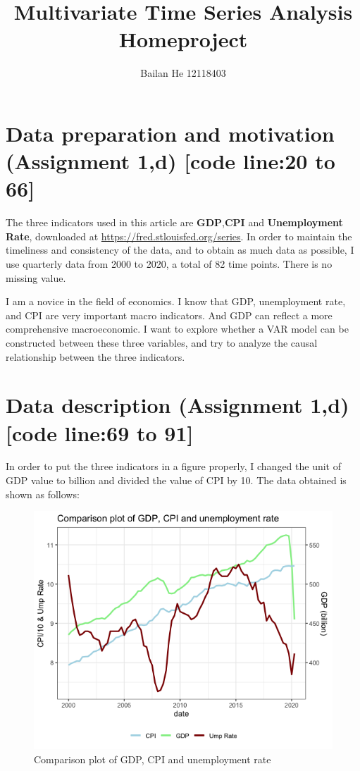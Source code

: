 \documentclass{report}
\begin{document}
\renewcommand{\thesection}{\arabic{section}}
\title{Multivariate Time Series Analysis Homeproject}
\author{Bailan He 12118403}
\maketitle
\tableofcontents
\newpage 

\section{Data preparation and motivation  (Assignment 1,d) [code line:20 to 66] }
The three indicators used in this article are \textbf{GDP},\textbf{CPI} and \textbf{Unemployment Rate}, downloaded at \url{https://fred.stlouisfed.org/series}. In order to maintain the timeliness and consistency of the data, and to obtain as much data as possible, I use quarterly data from 2000 to 2020, a total of 82 time points. There is no missing value.

I am a novice in the field of economics. I know that GDP, unemployment rate, and CPI are very important macro indicators. And GDP can reflect a more comprehensive macroeconomic. I want to explore whether a VAR model can be constructed between these three variables, and try to analyze the causal relationship between the three indicators.

\section{Data description (Assignment 1,d) [code line:69 to 91]}
In order to put the three indicators in a figure properly, I changed the unit of GDP value to billion and divided the value of CPI by 10. The data obtained is shown as follows:

\begin{figure}[H] 
\centering
\includegraphics[width=1\textwidth,height=0.4\textheight]{data_plot} 
\caption{Comparison plot of GDP, CPI and unemployment rate} 
\label{Fig.main1}
\end{figure}
\end{document}
